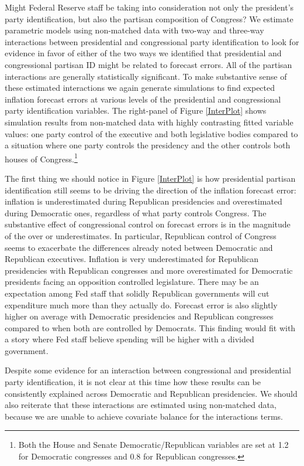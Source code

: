 \documentclass[a4paper]{article}\usepackage{graphicx, color}
\begin{document}
Might Federal Reserve staff be taking into consideration not only the president's party identification, but also the partisan composition of Congress?  We estimate parametric models using non-matched data with two-way and three-way interactions between presidential and congressional party identification to look for evidence in favor of either of the two ways we identified that presidential and congressional partisan ID might be related to forecast errors. All of the partisan interactions are generally statistically significant. To make substantive sense of these estimated interactions we again generate simulations to find expected inflation forecast errors at various levels of the presidential and congressional party identification variables. The right-panel of Figure \ref{InterPlot} shows simulation results from non-matched data with highly contrasting fitted variable values: one party control of the executive and both legislative bodies compared to a situation where one party controls the presidency and the other controls both houses of Congress.\footnote{Both the House and Senate Democratic/Republican variables are set at 1.2 for Democratic congresses and 0.8 for Republican congresses.} 

The first thing we should notice in Figure \ref{InterPlot} is how presidential partisan identification still seems to be driving the direction of the inflation forecast error: inflation is underestimated during Republican presidencies and overestimated during Democratic ones, regardless of what party controls Congress. The substantive effect of congressional control on forecast errors is in the magnitude of the over or underestimates. In particular, Republican control of Congress seems to exacerbate the differences already noted between Democratic and Republican executives. Inflation is very underestimated for Republican presidencies with Republican congresses and more overestimated for Democratic presidents facing an opposition controlled legislature. There may be an expectation among Fed staff that solidly Republican governments will cut expenditure much more than they actually do. Forecast error is also slightly higher on average with Democratic presidencies and Republican congresses compared to when both are controlled by Democrats. This finding would fit with a story where Fed staff believe spending will be higher with a divided government. 

Despite some evidence for an interaction between congressional and presidential party identification, it is not clear at this time how these results can be consistently explained across Democratic and Republican presidencies. We should also reiterate that these interactions are estimated using non-matched data, because we are unable to achieve covariate balance for the interactions terms.
\end{document}
